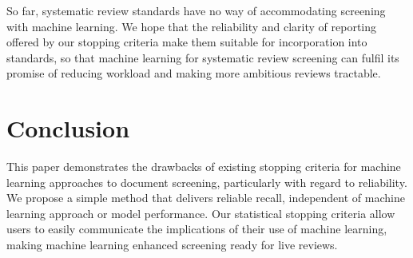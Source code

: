\documentclass{bmcart}
\begin{document}
	So far, systematic review standards have no way of accommodating screening with machine learning. 
	We hope that the reliability and clarity of reporting offered by our stopping criteria make them suitable for incorporation into standards, so that machine learning for systematic review screening can fulfil its promise of reducing workload and making more ambitious reviews tractable.
	
	\section*{Conclusion}
	
	This paper demonstrates the drawbacks of existing stopping criteria for machine learning approaches to document screening, particularly with regard to reliability. We propose a simple method that delivers reliable recall, independent of machine learning approach or model performance. Our statistical stopping criteria allow users to easily communicate the implications of their use of machine learning, making machine learning enhanced screening ready for live reviews.
	
\end{document}
